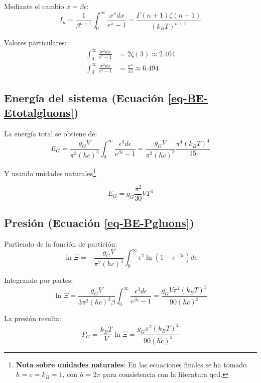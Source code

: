 Mediante el cambio $x = \beta\epsilon$:
\begin{equation}
I_n = \frac{1}{\beta^{n+1}} \int_0^\infty \frac{x^n dx}{e^x - 1} = \frac{\Gamma(n+1)\zeta(n+1)}{(k_B T)^{n+1}}
\end{equation}

Valores particulares:
\begin{align}
\int_0^\infty \frac{x^2 dx}{e^x - 1} &= 2\zeta(3) \approx 2.404 \\
\int_0^\infty \frac{x^3 dx}{e^x - 1} &= \frac{\pi^4}{15} \approx 6.494
\end{align}

\subsection{Energía del sistema (Ecuación \ref{eq-BE-Etotalgluons})}
La energía total se obtiene de:
\begin{equation}
E_G = \frac{g_G V}{\pi^2 (hc)^3} \int_0^\infty \frac{\epsilon^3 d\epsilon}{e^{\beta\epsilon} - 1} = \frac{g_G V}{\pi^2 (hc)^3} \frac{\pi^4 (k_B T)^4}{15}
\end{equation}

Y usando unidades naturales\footnote{\textbf{Nota sobre unidades naturales}: En las ecuaciones finales se ha tomado $\hbar = c = k_B = 1$, con $h = 2\pi$ para consistencia con la literatura \gls{qcd}.}

\begin{equation}
E_G = g_G \frac{\pi^2}{30} V T^4
\end{equation}

\subsection{Presión (Ecuación \ref{eq-BE-Pgluons})}
Partiendo de la función de partición:
\begin{equation}
\ln \Xi = -\frac{g_G V}{\pi^2 (hc)^3} \int_0^\infty \epsilon^2 \ln(1 - e^{-\beta\epsilon}) d\epsilon
\end{equation}

Integrando por partes:
\begin{equation}
\ln \Xi = \frac{g_G V}{3\pi^2 (hc)^3 \beta} \int_0^\infty \frac{\epsilon^3 d\epsilon}{e^{\beta\epsilon} - 1} = \frac{g_G V \pi^2 (k_B T)^3}{90 (hc)^3}
\end{equation}

La presión resulta:
\begin{equation}
P_G = \frac{k_B T}{V} \ln \Xi = \frac{g_G \pi^2 (k_B T)^4}{90 (hc)^3}
\end{equation}

